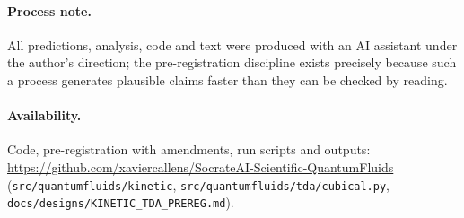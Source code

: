 \documentclass[11pt,a4paper]{article}
\begin{document}
\paragraph{Process note.} All predictions, analysis, code and text were produced with an AI assistant
under the author's direction; the pre-registration discipline exists precisely because such a process
generates plausible claims faster than they can be checked by reading.

\paragraph{Availability.} Code, pre-registration with amendments, run scripts and outputs:
\url{https://github.com/xaviercallens/SocrateAI-Scientific-QuantumFluids}
(\texttt{src/quantumfluids/kinetic}, \texttt{src/quantumfluids/tda/cubical.py},
\texttt{docs/designs/KINETIC\_TDA\_PREREG.md}).



\end{document}
